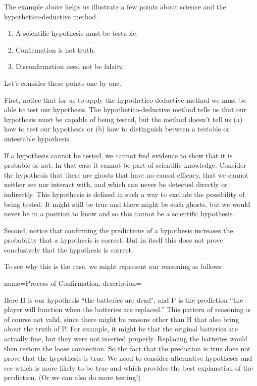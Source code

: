 The example above helps us illustrate a few points about science and the hypothetico-deductive method.

\begin{enumerate}
\item A scientific hypothesis must be testable.
\item Confirmation is not truth.
\item Disconfirmation need not be falsity.
\end{enumerate}

Let's consider these points one by one.

First, notice that for us to apply the hypothetico-deductive method we must be able to test our hypothesis. The hypothetico-deductive method tells us that our hypothesis must be capable of being tested, but the method doesn't tell us (a) how to test our hypothesis or (b) how to distinguish between a testable or untestable hypothesis.

If a hypothesis cannot be tested, we cannot find evidence to show that it is probable or not. In that case it cannot be part of scientific knowledge. Consider the hypothesis that there are ghosts that have no causal efficacy, that we cannot neither see nor interact with, and which can never be detected directly or indirectly. This hypothesis is defined in such a way to exclude the possibility of being tested. It might still be true and there might be such ghosts, but we would never be in a position to know and so this cannot be a scientific hypothesis.

Second, notice that confirming the predictions of a hypothesis increases the probability that a hypothesis is correct. But in itself this does not prove conclusively that the hypothesis is correct.

To see why this is the case, we might represent our reasoning as follows:

\begin{kormanize}
\end{kormanize}

{
name=Process of Confirmation,
description={}
}

Here H is our hypothesis ``the batteries are dead", and P is the prediction ``the player will function when the batteries are replaced.'' This pattern of reasoning is of course not valid, since there might be reasons other than H that also bring about the truth of P. For example, it might be that the original batteries are actually fine, but they were not inserted properly. Replacing the batteries would then restore the loose connection. So the fact that the prediction is true does not prove that the hypothesis is true. We need to consider alternative hypotheses and see which is more likely to be true and which provides the best explanation of the prediction. (Or we can also do more testing!)

